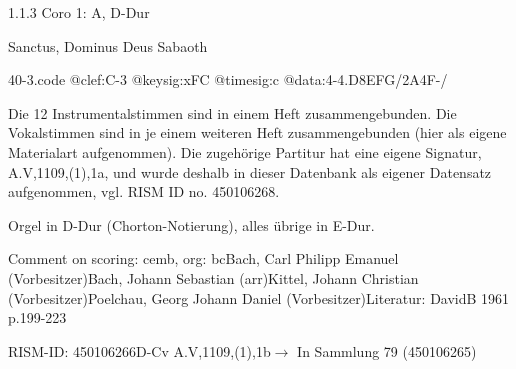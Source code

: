 \documentclass[a4paper, twocolumn, 11pt]{book}
\begin{document}
\par 1.1.3  Coro 1: A, D-Dur\newline \begin{footnotesize} Sanctus, Dominus Deus Sabaoth \end{footnotesize}  
\begin{filecontents*}{40-3.code}
@clef:C-3
@keysig:xFC
@timesig:c
@data:4-4.D{8EFG}/2A4F-/
\end{filecontents*}
\newline %
\par Die 12 Instrumentalstimmen sind in einem Heft zusammengebunden. Die Vokalstimmen sind in je einem weiteren Heft zusammengebunden (hier als eigene Materialart aufgenommen). Die zugehörige Partitur hat eine eigene Signatur, A.V,1109,(1),1a, und wurde deshalb in dieser Datenbank als eigener Datensatz aufgenommen, vgl. RISM ID no. 450106268.
\par Orgel in D-Dur (Chorton-Notierung), alles übrige in E-Dur.
\par Comment on scoring: cemb, org: bc\newline Bach, Carl Philipp Emanuel  (Vorbesitzer)\newline Bach, Johann Sebastian  (arr)\newline Kittel, Johann Christian  (Vorbesitzer)\newline Poelchau, Georg Johann Daniel  (Vorbesitzer)\newline Literatur: DavidB 1961  p.199-223
\par RISM-ID: 450106266\newline D-Cv  A.V,1109,(1),1b\newline $\rightarrow$ In Sammlung 79 (450106265)
      
\end{document}
